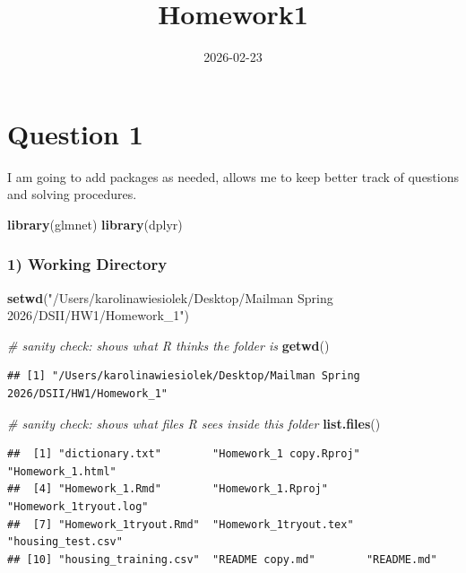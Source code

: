 \documentclass[
]{article}
\title{Homework1}
\author{}
\date{\vspace{-2.5em}2026-02-23}
\newenvironment{Shaded}{\begin{snugshade}}{\end{snugshade}}
\newcommand{\CommentTok}[1]{\textcolor[rgb]{0.56,0.35,0.01}{\textit{#1}}}
\newcommand{\FunctionTok}[1]{\textcolor[rgb]{0.13,0.29,0.53}{\textbf{#1}}}
\newcommand{\NormalTok}[1]{#1}
\newcommand{\StringTok}[1]{\textcolor[rgb]{0.31,0.60,0.02}{#1}}
\begin{document}
\maketitle

\section{Question 1}\label{question-1}

I am going to add packages as needed, allows me to keep better track of
questions and solving procedures.

\begin{Shaded}
\begin{Highlighting}[]
\FunctionTok{library}\NormalTok{(glmnet)  }
\FunctionTok{library}\NormalTok{(dplyr)  }
\end{Highlighting}
\end{Shaded}

\subsubsection{1) Working Directory}\label{working-directory}

\begin{Shaded}
\begin{Highlighting}[]
\FunctionTok{setwd}\NormalTok{(}\StringTok{"/Users/karolinawiesiolek/Desktop/Mailman Spring 2026/DSII/HW1/Homework\_1"}\NormalTok{)}

\CommentTok{\# sanity check: shows what R thinks the folder is}
\FunctionTok{getwd}\NormalTok{()}
\end{Highlighting}
\end{Shaded}

\begin{verbatim}
## [1] "/Users/karolinawiesiolek/Desktop/Mailman Spring 2026/DSII/HW1/Homework_1"
\end{verbatim}

\begin{Shaded}
\begin{Highlighting}[]
\CommentTok{\# sanity check: shows what files R sees inside this folder}
\FunctionTok{list.files}\NormalTok{()}
\end{Highlighting}
\end{Shaded}

\begin{verbatim}
##  [1] "dictionary.txt"        "Homework_1 copy.Rproj" "Homework_1.html"      
##  [4] "Homework_1.Rmd"        "Homework_1.Rproj"      "Homework_1tryout.log" 
##  [7] "Homework_1tryout.Rmd"  "Homework_1tryout.tex"  "housing_test.csv"     
## [10] "housing_training.csv"  "README copy.md"        "README.md"
\end{verbatim}
\end{document}
